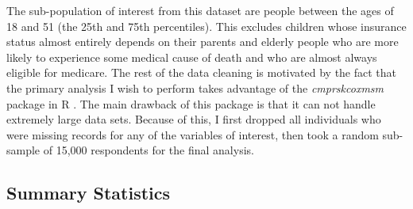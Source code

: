 \documentclass{article}
\begin{document}
The sub-population of interest from this dataset are people between the ages of 18 and 51 (the 25th and 75th percentiles). This excludes children whose insurance status almost entirely depends on their parents and elderly people who are more likely to experience some medical cause of death and who are almost always eligible for medicare. The rest of the data cleaning is motivated by the fact that the primary analysis I wish to perform takes advantage of the \emph{cmprskcoxmsm} package in R \parencite{cmprskcoxmsm}. The main drawback of this package is that it can not handle extremely large data sets. Because of this, I first dropped all individuals who were missing records for any of the variables of interest, then took a random sub-sample of 15,000 respondents for the final analysis. 


\subsection{Summary Statistics}
\end{document}
